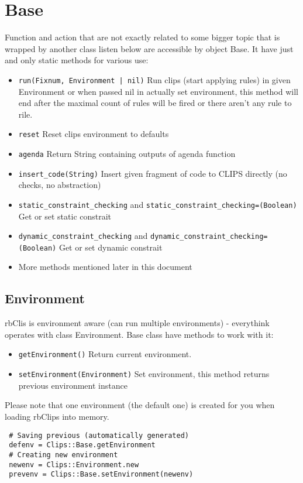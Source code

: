 \documentclass[a4paper,10pt]{article}
\begin{document}
\section{Base}
Function and action that are not exactly related to some bigger topic that is wrapped by another class listen below are accessible by object Base. It have just and only static methods for various use:
\begin{itemize}
 \item \texttt{run(Fixnum, Environment | nil)} Run clips (start applying rules) in given Environment or when passed nil in actually set environment, this method will end after the maximal count of rules will be fired or there aren't any rule to rile.
 \item \texttt{reset} Reset clips environment to defaults
 \item \texttt{agenda} Return String containing outputs of agenda function
 \item \texttt{insert\_code(String)} Insert given fragment of code to CLIPS directly (no checks, no abstraction)
 \item \texttt{static\_constraint\_checking} and \texttt{static\_constraint\_checking=(Boolean)} Get or set static constrait
 \item \texttt{dynamic\_constraint\_checking} and \texttt{dynamic\_constraint\_checking=(Boolean)} Get or set dynamic constrait
 \item More methods mentioned later in this document
\end{itemize}

\subsection{Environment}
rbClis is environment aware (can run multiple environments) - everythink operates with class Environment. Base class have methods to work with it:
\begin{itemize}
 \item \texttt{getEnvironment()} Return current environment.
 \item \texttt{setEnvironment(Environment)} Set environment, this method returns previous environment instance
\end{itemize}
Please note that one environment (the default one) is created for you when loading rbClips into memory.

\begin{verbatim}
 # Saving previous (automatically generated)
 defenv = Clips::Base.getEnvironment
 # Creating new environment
 newenv = Clips::Environment.new
 prevenv = Clips::Base.setEnvironment(newenv)
\end{verbatim}
\end{document}
